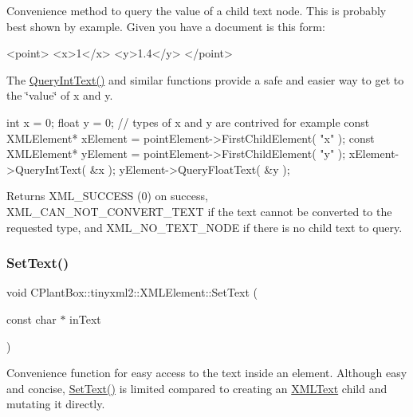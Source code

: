 Convenience method to query the value of a child text node. This is probably best shown by example. Given you have a document is this form\+: \begin{DoxyVerb}    <point>
        <x>1</x>
        <y>1.4</y>
    </point>
\end{DoxyVerb}


The \hyperlink{classCPlantBox_1_1tinyxml2_1_1XMLElement_a7e9b4ac7facb5bdca905036e2dbff523}{Query\+Int\+Text()} and similar functions provide a safe and easier way to get to the \char`\"{}value\char`\"{} of x and y.

\begin{DoxyVerb}    int x = 0;
    float y = 0;    // types of x and y are contrived for example
    const XMLElement* xElement = pointElement->FirstChildElement( "x" );
    const XMLElement* yElement = pointElement->FirstChildElement( "y" );
    xElement->QueryIntText( &x );
    yElement->QueryFloatText( &y );
\end{DoxyVerb}


\begin{DoxyReturn}{Returns}
X\+M\+L\+\_\+\+S\+U\+C\+C\+E\+SS (0) on success, X\+M\+L\+\_\+\+C\+A\+N\+\_\+\+N\+O\+T\+\_\+\+C\+O\+N\+V\+E\+R\+T\+\_\+\+T\+E\+XT if the text cannot be converted to the requested type, and X\+M\+L\+\_\+\+N\+O\+\_\+\+T\+E\+X\+T\+\_\+\+N\+O\+DE if there is no child text to query. 
\end{DoxyReturn}
\mbox{\label{classCPlantBox_1_1tinyxml2_1_1XMLElement_ab658660a1b4c5892a48c084c9dacfdcf}} 
\subsubsection{\texorpdfstring{Set\+Text()}{SetText()}}
{\footnotesize\ttfamily void C\+Plant\+Box\+::tinyxml2\+::\+X\+M\+L\+Element\+::\+Set\+Text (\begin{DoxyParamCaption}\item[{const char $\ast$}]{in\+Text }\end{DoxyParamCaption})}

Convenience function for easy access to the text inside an element. Although easy and concise, \hyperlink{classCPlantBox_1_1tinyxml2_1_1XMLElement_ab658660a1b4c5892a48c084c9dacfdcf}{Set\+Text()} is limited compared to creating an \hyperlink{classCPlantBox_1_1tinyxml2_1_1XMLText}{X\+M\+L\+Text} child and mutating it directly.

